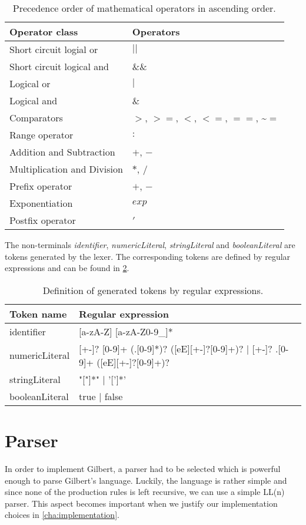 \begin{table}
	\centering
	\begin{tabular}{l|l}
	Operator class & Operators\\
	\hline
	Short circuit logial or & $||$\\
	Short circuit logical and & $\&\&$\\
	Logical or & $|$ \\
	Logical and & $\&$ \\
	Comparators & $>$, $>=$, $<$, $<=$, $==$, \textasciitilde$=$\\
	Range operator & $:$ \\
	Addition and Subtraction & $+$, $-$\\
	Multiplication and Division & $*$, $/$\\
	Prefix operator & $+$, $-$\\
	Exponentiation & $exp$\\
	Postfix operator & $'$
	\end{tabular}
	\caption{Precedence order of mathematical operators in ascending order.}
	\label{tab:precedences}
\end{table}

The non-terminals \emph{identifier}, \emph{numericLiteral}, \emph{stringLiteral} and \emph{booleanLiteral} are tokens generated by the lexer. The corresponding tokens are defined by regular expressions and can be found in \cref{tab:tokens}.

\begin{table}
	\centering
	\begin{tabular}{l|l}
	Token name & Regular expression\\
	\hline
	identifier & [a-zA-Z] [a-zA-Z0-9\_]*\\
	numericLiteral & [+-]? [0-9]+ (.[0-9]*)? ([eE][+-]?[0-9]+)? | [+-]? .[0-9]+ ([eE][+-]?[0-9]+)? \\
	stringLiteral & "["]*" | '[']*'\\
	booleanLiteral & true | false
	\end{tabular}
	\caption{Definition of generated tokens by regular expressions.}
	\label{tab:tokens}
\end{table}

\section{Parser}

In order to implement Gilbert, a parser had to be selected which is powerful enough to parse Gilbert's language.
Luckily, the language is rather simple and since none of the production rules is left recursive, we can use a simple LL(n) parser.
This aspect becomes important when we justify our implementation choices in \cref{cha:implementation}.

